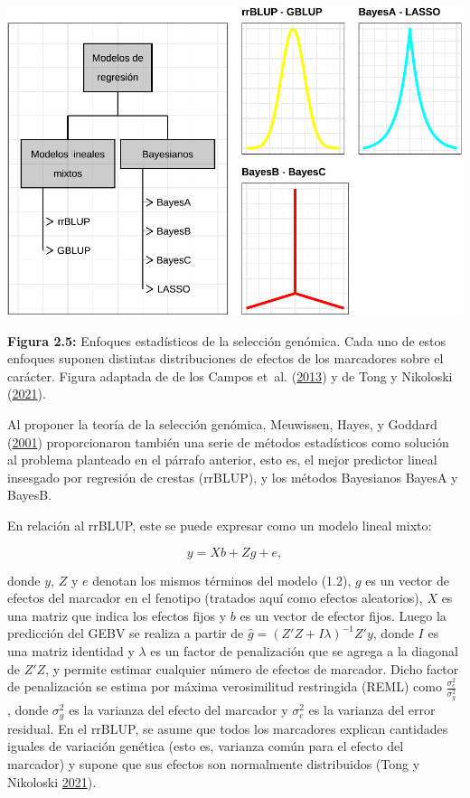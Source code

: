 \documentclass[11pt,spanish,a4paper,oneside,]{book} %
\begin{document}
\begin{center}\includegraphics[width=1\linewidth]{figures/Mod_GS} \end{center}

\begin{center}
\textbf{Figura 2.5:} Enfoques estadísticos de la selección genómica. Cada uno de estos enfoques suponen distintas distribuciones de efectos de los marcadores sobre el carácter. Figura adaptada de de los Campos et~al. (\protect\hyperlink{ref-cite:31}{2013}) y de Tong y Nikoloski (\protect\hyperlink{ref-cite:7}{2021}).

\end{center}

Al proponer la teoría de la selección genómica, Meuwissen, Hayes, y Goddard (\protect\hyperlink{ref-cite:8}{2001}) proporcionaron también una serie de métodos estadísticos como solución al problema planteado en el párrafo anterior, esto es, el mejor predictor lineal insesgado por regresión de crestas (rrBLUP), y los métodos Bayesianos BayesA y BayesB.

En relación al rrBLUP, este se puede expresar como un modelo lineal mixto:

\begin{equation}
y = Xb + Zg + e,
\end{equation}

donde \(y\), \(Z\) y \(e\) denotan los mismos términos del modelo (1.2), \(g\) es un vector de efectos del marcador en el fenotipo (tratados aquí como efectos aleatorios), \(X\) es una matriz que indica los efectos fijos y \(b\) es un vector de efector fijos. Luego la predicción del GEBV se realiza a partir de \(\hat{g} = (Z'Z + I \lambda)^{- 1} Z'y\), donde \(I\) es una matriz identidad y \(\lambda\) es un factor de penalización que se agrega a la diagonal de \(Z'Z\), y permite estimar cualquier número de efectos de marcador. Dicho factor de penalización se estima por máxima verosimilitud restringida (REML) como \(\frac{\sigma^{2}_{e}} {\sigma^{2}_{g}}\) , donde \(\sigma^{2}_{g}\) es la varianza del efecto del marcador y \(\sigma^{2}_{e}\) es la varianza del error residual. En el rrBLUP, se asume que todos los marcadores explican cantidades iguales de variación genética (esto es, varianza común para el efecto del marcador) y supone que sus efectos son normalmente distribuidos (Tong y Nikoloski \protect\hyperlink{ref-cite:7}{2021}).
\end{document}
